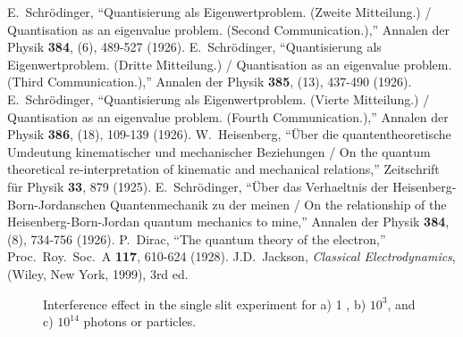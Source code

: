 \documentclass[preprint,footinbib,preprintnumbers,amsmath,amssymb,prb,12pt]{revtex4}
\begin{document}
\begin{thebibliography}{}
E.~Schr\"{o}dinger, ``Quantisierung als Eigenwertproblem. (Zweite Mitteilung.) / Quantisation as an eigenvalue problem. (Second Communication.),''  Annalen der Physik \textbf{384}, (6), 489-527 (1926).
E.~Schr\"{o}dinger, ``Quantisierung als Eigenwertproblem. (Dritte Mitteilung.) / Quantisation as an eigenvalue problem. (Third Communication.),''  Annalen der Physik \textbf{385}, (13), 437-490 (1926).
E.~Schr\"{o}dinger, ``Quantisierung als Eigenwertproblem. (Vierte Mitteilung.) / Quantisation as an eigenvalue problem. (Fourth Communication.),''  Annalen der Physik \textbf{386}, (18), 109-139 (1926).
W.~Heisenberg, ``{\"{U}}ber die quantentheoretische Umdeutung kinematischer und mechanischer Beziehungen / On the quantum theoretical re-interpretation of kinematic and mechanical relations,''  Zeitschrift f{\"{u}}r Physik \textbf{33}, 879 (1925).
E.~Schr\"{o}dinger, ``{\"{U}}ber das Verhaeltnis der Heisenberg-Born-Jordanschen Quantenmechanik zu der meinen / On the relationship of the Heisenberg-Born-Jordan quantum mechanics to mine,''  Annalen der Physik \textbf{384}, (8), 734-756 (1926).
P.~Dirac, ``The quantum theory of the electron,'' Proc.~Roy.~Soc.~A \textbf{117}, 610-624 (1928).
 J.D.~Jackson, \textit{Classical Electrodynamics}, (Wiley, New York, 1999), 3rd ed.

\end{thebibliography}

\newpage\clearpage
\begin{figure*}
\caption{\label{fig:slits} Interference effect in the single slit experiment for a) 1 , b) $10^{3}$, and c) $10^{14}$ photons or particles.}
\end{figure*}
\end{document}
